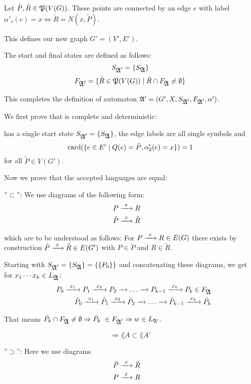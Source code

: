 Let $\tilde{P}, \tilde{R} \in \mathfrak{P}(V(G))$. These points are connected by an
edge $e$ with label $\alpha'_s(e) = x \Leftrightarrow \tilde{R} = N(x, \tilde{P})$.

This defines our new graph $G' = (V', E')$.

The start and final states are defined as follows:
\[ S_{\mbox{$\mathfrak{A'}$}} = \{ S_{\mbox{$\mathfrak{A}$}} \} \]
\[ F_{\mbox{$\mathfrak{A'}$}} = \{ \tilde{R} \in \mathfrak{P}(V(G)) \mid \tilde{R} \cap
F_{\mbox{$\mathfrak{A}$}} \neq \emptyset \} \]

This completes the definition of automaton $\mbox{$\mathfrak{A'}$} = (G', X,
S_{\mbox{$\mathfrak{A'}$}}, F_{\mbox{$\mathfrak{A'}$}}, \alpha')$.

We first prove that
 is complete and deterministic:

 has a single start state $S_{\mbox{$\mathfrak{A'}$}} = \{ S_{\mbox{$\mathfrak{A}$}}
\}$, the edge labels are all single symbols and 
\[ \mathrm{card}(\mbox{$\{e \in E' \mid Q(e) = \tilde{P}, \alpha'_2(e) = x\}$}) = 1 \]
for all $\tilde{P} \in V(G')$.

Now we prove that the accepted languages are equal:

''$\subset$'': We use diagrams of the following form:
\begin{eqnarray*}
& P \xrightarrow{\ {x}\ } R & \\
& \tilde{P} \xrightarrow{\ {x}\ } \tilde{R} &
\end{eqnarray*}

which are to be understood as follows: For $P \xrightarrow{\ {x}\ } R \in E(G)$
there exists by construction $\tilde{P} \xrightarrow{\ {x}\ } \tilde{R} \in
E(G')$ with $P \in \tilde{P}$ and $R \in \tilde{R}$.

Starting with $S_{\mbox{$\mathfrak{A'}$}} = \{ S_{\mbox{$\mathfrak{A}$}} \} = \{ \{ P_0 \} \}$ and
concatenating these diagrams, we get for $x_1 \cdots x_k \in
L_{\mbox{$\mathfrak{A}$}}$:
\begin{eqnarray*}
 & & P_0 \xrightarrow{\ {x_1}\ } P_1 \xrightarrow{\ {x_2}\ } P_2 \xrightarrow{\ {}\ } \ldots \xrightarrow{\ {}\ } P_{k-1} \xrightarrow{\ {x_k}\ }
 P_k \in F_{\mbox{$\mathfrak{A}$}} \\
 & & \tilde{P}_0 \xrightarrow{\ {x_1}\ } \tilde{P}_1 \xrightarrow{\ {x_2}\ } \tilde{P}_2 \xrightarrow{\ {}\ } \ldots
 \xrightarrow{\ {}\ } \tilde{P}_{k-1} \xrightarrow{\ {x_k}\ } \tilde{P_k}
\end{eqnarray*}

That means $\tilde{P_k} \cap F_{\mbox{$\mathfrak{A}$}} \neq \emptyset \Rightarrow \tilde{P}_k \
\in F_{\mbox{$\mathfrak{A'}$}} \Rightarrow w \in \mbox{$L_{\mathfrak{A'}}$}.$

\[ \Rightarrow \lang{A} \subset \lang{A'}\]

''$\supset$'': Here we use diagrams  
\begin{eqnarray*}
& \tilde{P} \xrightarrow{\ {x}\ } \tilde{R} & \\
& P \xrightarrow{\ {x}\ } R & 
\end{eqnarray*}

